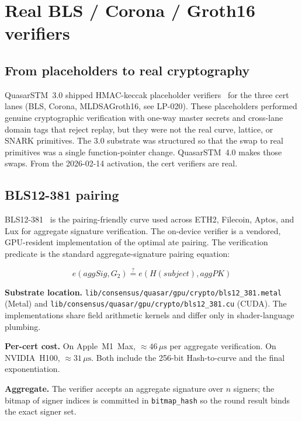 \section{Real BLS / Corona / Groth16 verifiers}

\label{sec:verifiers}

\subsection{From placeholders to real cryptography}

QuasarSTM~3.0 shipped HMAC-keccak placeholder
verifiers~\cite{lp010-quasarstm-3} for the three cert lanes (BLS,
Corona, MLDSAGroth16, see LP-020). These placeholders performed
genuine cryptographic verification with one-way master secrets and
cross-lane domain tags that reject replay, but they were not the real
curve, lattice, or SNARK primitives. The 3.0 substrate was structured
so that the swap to real primitives was a single function-pointer
change. QuasarSTM~4.0 makes those swaps. From the 2026-02-14
activation, the cert verifiers are real.

\subsection{BLS12-381 pairing}

BLS12-381~\cite{bls12381} is the pairing-friendly curve used across
ETH2, Filecoin, Aptos, and Lux for aggregate signature verification.
The on-device verifier is a vendored, GPU-resident implementation of
the optimal ate pairing. The verification predicate is the standard
aggregate-signature pairing equation:

\[
e(\mathit{aggSig}, G_2) \stackrel{?}{=} e(H(\mathit{subject}), \mathit{aggPK})
\]

\textbf{Substrate location.}
\texttt{lib/consensus/quasar/gpu/crypto/bls12\_381.metal} (Metal) and
\texttt{lib/consensus/quasar/gpu/crypto/bls12\_381.cu} (CUDA). The
implementations share field arithmetic kernels and differ only in
shader-language plumbing.

\textbf{Per-cert cost.} On Apple~M1~Max, $\approx 46\,\mu\text{s}$ per
aggregate verification. On NVIDIA~H100, $\approx 31\,\mu\text{s}$. Both
include the 256-bit Hash-to-curve and the final exponentiation.

\textbf{Aggregate.} The verifier accepts an aggregate signature over
$n$ signers; the bitmap of signer indices is committed in
\texttt{bitmap\_hash} so the round result binds the exact signer set.

